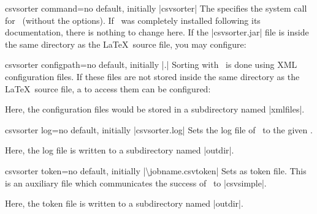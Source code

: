 \documentclass[a4paper,11pt]{ltxdoc}
\begin{document}
\begin{docCsvKey}{csvsorter command}{=}{no default, initially |csvsorter|}
  The  specifies the system call for \csvsorter\ (without the options).
  If \csvsorter\ was completely installed following its documentation, there is
  nothing to change here. If the |csvsorter.jar| file is inside the same
  directory as the \LaTeX\ source file, you may configure:%
\begin{dispListing}
\end{dispListing}
\end{docCsvKey}

\begin{docCsvKey}{csvsorter configpath}{=}{no default, initially |.|}
  Sorting with \csvsorter\ is done using XML configuration files. If these files
  are not stored inside the same directory as the \LaTeX\ source file, a
   to access them can be configured:
\begin{dispListing}
\end{dispListing}
  Here, the configuration files would be stored in a subdirectory named |xmlfiles|.
\end{docCsvKey}

\begin{docCsvKey}{csvsorter log}{=}{no default, initially |csvsorter.log|}
  Sets the log file of \csvsorter\ to the given .
\begin{dispListing}
\end{dispListing}
  Here, the log file is written to a subdirectory named |outdir|.
\end{docCsvKey}

\clearpage
\begin{docCsvKey}{csvsorter token}{=}{no default, initially |\textbackslash jobname.csvtoken|}
  Sets  as token file. This is an auxiliary file which
  communicates the success of \csvsorter\ to |csvsimple|.
\begin{dispListing}
\end{dispListing}
  Here, the token file is written to a subdirectory named |outdir|.
\end{docCsvKey}
\end{document}
